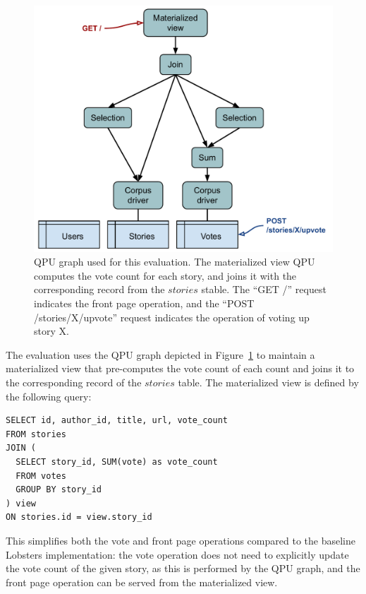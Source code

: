 \begin{figure}[H]
  \centering
    \includegraphics[scale=0.5]{./figures/evaluation/lobsters_architecture_eval.pdf}
  \caption{QPU graph used for this evaluation. The materialized view QPU computes the vote count for each story,
  and joins it with the corresponding record from the $stories$ stable.
  The ``GET /'' request indicates the front page operation, and the ``POST /stories/X/upvote'' request indicates the operation of voting up story X.}
  \label{fig:eval_lobsters_qpu_arch}
\end{figure}

\bigskip
\noindent
The evaluation uses the QPU graph depicted in Figure~\ref{fig:eval_lobsters_qpu_arch} to maintain a materialized view that
pre-computes the vote count of each count and joins it to the corresponding record of the $stories$ table.
The materialized view is defined by the following query:

\begin{lstlisting}[caption={Definition of the materialized view maintained by the QPU graph shown in Figure~\ref{fig:eval_lobsters_qpu_arch}.}]
SELECT id, author_id, title, url, vote_count
FROM stories
JOIN (
  SELECT story_id, SUM(vote) as vote_count
  FROM votes
  GROUP BY story_id
) view
ON stories.id = view.story_id
\end{lstlisting}

This simplifies both the vote and front page operations compared to the baseline Lobsters implementation:
the vote operation does not need to explicitly update the vote count of the given story, as this
is performed by the QPU graph,
and the front page operation can be served from the materialized view.

